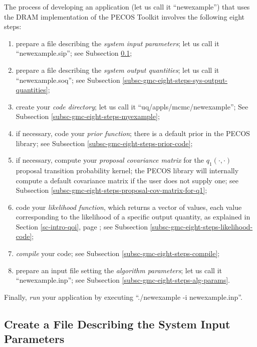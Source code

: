 The process of developing an application (let us call it ``newexample'') 
that uses the DRAM implementation of the PECOS Toolkit involves the following eight steps:
\begin{enumerate}
\item prepare a file describing the {\it system input parameters}; let us call it ``newexample.sip''; see Subsection \ref{subsc-gmc-eight-steps-sys-input-params};
\item prepare a file describing the {\it system output quantities}; let us call it ``newexample.soq''; see Subsection \ref{subsc-gmc-eight-steps-sys-output-quantities};
\item create your {\it code directory}; let us call it ``uq/appls/mcmc/newexample''; See Subsection \ref{subsc-gmc-eight-steps-myexample};
\item if necessary, code your {\it prior function}; there is a default prior in the PECOS library; see Subsection \ref{subsc-gmc-eight-steps-prior-code};
\item if necessary, compute your {\it proposal covariance matrix} for the $q_1(\cdot,\cdot)$ proposal transition probability kernel; the PECOS library will internally compute a default covariance matrix if the user does not supply one; see Subsection \ref{subsc-gmc-eight-steps-proposal-cov-matrix-for-q1};
\item code your {\it likelihood function}, which returns a vector of values, each value corresponding to the likelihood of a specific output quantity, as explained in Section \ref{sc-intro-qoi}, page \pageref{sc-intro-qoi}; see Subsection \ref{subsc-gmc-eight-steps-likelihood-code};
\item {\it compile} your code; see Subsection \ref{subsc-gmc-eight-steps-compile};
\item prepare an input file setting the {\it algorithm parameters}; let us call it ``newexample.inp''; see Subsection \ref{subsc-gmc-eight-steps-alg-params}.
\end{enumerate}
Finally, {\it run} your application by executing ``./newexample -i newexample.inp''.

\subsection{Create a File Describing the System Input Parameters}\label{subsc-gmc-eight-steps-sys-input-params}

